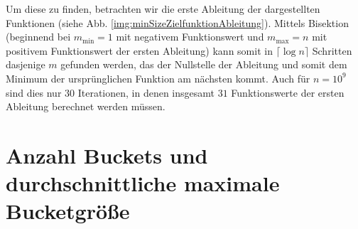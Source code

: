 \documentclass[a4paper,12pt,twoside]{report}
\begin{document}
Um diese zu finden, betrachten wir die erste Ableitung der dargestellten Funktionen (siehe Abb. \ref{img:minSizeZielfunktionAbleitung}).
Mittels Bisektion (beginnend bei $m_{\min}=1$ mit negativem Funktionswert und $m_{\max}=n$ mit positivem Funktionswert der ersten Ableitung) kann somit in $\lceil\log n\rceil$ Schritten dasjenige $m$ gefunden werden, das der Nullstelle der Ableitung und somit dem Minimum der ursprünglichen Funktion am nächsten kommt.
Auch für $n=10^9$ sind dies nur $30$ Iterationen, in denen insgesamt $31$ Funktionswerte der ersten Ableitung berechnet werden müssen.


\section{Anzahl Buckets und durchschnittliche maximale Bucketgröße}
\label{sec:avgMaxBucketgroesse}
\end{document}
